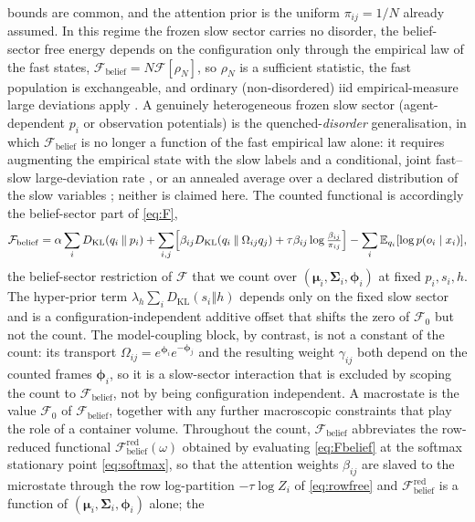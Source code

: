 \documentclass[11pt]{article}
\theoremstyle{plain}
\theoremstyle{definition}
\newcommand{\KL}[2]{D_{\mathrm{KL}}\mathopen{}\left(#1 \mathbin{\Vert} #2\right)\mathclose{}}
\newcommand{\E}{\mathbb{E}}
\newcommand{\bmu}{\boldsymbol{\mu}}
\newcommand{\bSigma}{\boldsymbol{\Sigma}}
\newcommand{\bphi}{\boldsymbol{\phi}}
\newcommand{\Fcal}{\mathcal{F}}
\newcommand{\Omegaij}{\Omega_{ij}}
\newcommand{\betaij}{\beta_{ij}}
\newcommand{\gammaij}{\gamma_{ij}}
\begin{document}
bounds are common, and the attention prior is the uniform $\pi_{ij}=1/N$ already
assumed. In this regime the frozen slow sector carries no disorder, the belief-sector
free energy depends on the configuration only through the empirical law of the fast
states, $\Fcal_{\mathrm{belief}}=N\Fcal[\rho_N]$, so $\rho_N$ is a sufficient
statistic, the fast population is exchangeable, and ordinary (non-disordered) iid
empirical-measure large deviations apply \citep[Thm.~6.2.10]{dembo1998large}. A
genuinely heterogeneous frozen slow sector (agent-dependent $p_i$ or observation
potentials) is the quenched-\emph{disorder} generalisation, in which
$\Fcal_{\mathrm{belief}}$ is no longer a function of the fast empirical law alone: it
requires augmenting the empirical state with the slow labels and a conditional, joint
fast--slow large-deviation rate \citep{comets1989large}, or an annealed average over a
declared distribution of the slow variables \citep{touchette2009large}; neither is
claimed here. The counted functional is
accordingly the belief-sector part of \cref{eq:F},
\begin{equation}
\label{eq:Fbelief}
\Fcal_{\mathrm{belief}}=\alpha\sum_i\KL{q_i}{p_i}
+\sum_{i,j}\Bigl[\betaij\KL{q_i}{\Omegaij q_j}+\tau\betaij\log\tfrac{\betaij}{\pi_{ij}}\Bigr]
-\sum_i\E_{q_i}[\log p(o_i\mid x_i)],
\end{equation}
the belief-sector restriction of $\Fcal$ that we count over $(\bmu_i,\bSigma_i,\bphi_i)$ at
fixed $p_i,s_i,h$. The hyper-prior term $\lambda_h\sum_i\KL{s_i}{h}$ depends only on
the fixed slow sector and is a configuration-independent additive offset that shifts
the zero of $\Fcal_0$ but not the count. The model-coupling block, by contrast, is
not a constant of the count: its transport $\Omegaij=e^{\bphi_i}e^{-\bphi_j}$ and the
resulting weight $\gammaij$ both depend on the counted frames $\bphi_i$, so it is a
slow-sector interaction that is excluded by scoping the count to
$\Fcal_{\mathrm{belief}}$, not by being configuration independent. A macrostate is the
value $\Fcal_0$ of $\Fcal_{\mathrm{belief}}$, together with any
further macroscopic constraints that play the role of a container volume. Throughout the
count, $\Fcal_{\mathrm{belief}}$ abbreviates the row-reduced functional
$\Fcal_{\mathrm{belief}}^{\mathrm{red}}(\omega)$ obtained by evaluating \cref{eq:Fbelief} at the
softmax stationary point \cref{eq:softmax}, so that the attention weights $\betaij$ are slaved to the
microstate through the row log-partition $-\tau\log Z_i$ of \cref{eq:rowfree} and
$\Fcal_{\mathrm{belief}}^{\mathrm{red}}$ is a function of $(\bmu_i,\bSigma_i,\bphi_i)$ alone; the
\end{document}
